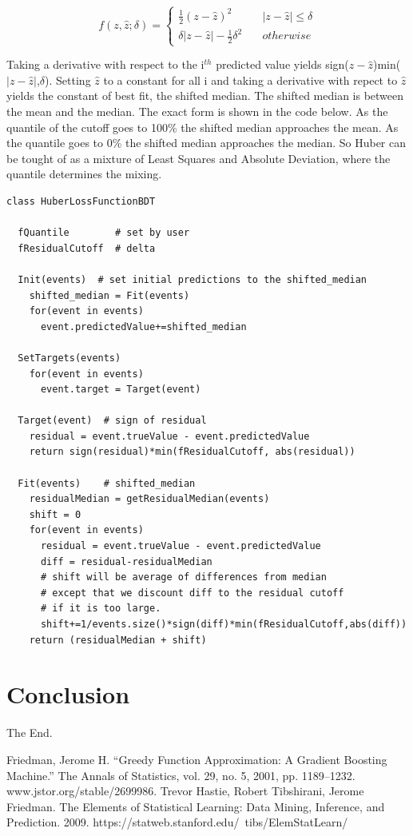 \documentclass[12pt]{article}
\begin{document}
$$
f(z,\hat{z}; \delta) = \left\{
        \begin{array}{ll}
            \frac{1}{2}(z-\hat{z})^2 & \quad |z-\hat{z}| \leq \delta \\
            \delta|z-\hat{z}| - \frac{1}{2}\delta^2 & \quad otherwise
        \end{array}
    \right.
$$

Taking a derivative with respect to the i$^{th}$ predicted value yields sign($z-\hat{z}$)min($|z-\hat{z}|$,$\delta$). Setting $\hat{z}$ to a constant for all i and taking a derivative with repect to $\hat{z}$ yields the constant of best fit, the shifted median. The shifted median is between the mean and the median. The exact form is shown in the code below. As the quantile of the cutoff goes to 100\% the shifted median approaches the mean. As the quantile goes to 0\% the shifted median approaches the median. So Huber can be tought of as a mixture of Least Squares and Absolute Deviation, where the quantile determines the mixing. 

\begin{verbatim}
class HuberLossFunctionBDT

  fQuantile        # set by user
  fResidualCutoff  # delta

  Init(events)  # set initial predictions to the shifted_median
    shifted_median = Fit(events)
    for(event in events)
      event.predictedValue+=shifted_median

  SetTargets(events)  
    for(event in events)  
      event.target = Target(event)

  Target(event)  # sign of residual                 
    residual = event.trueValue - event.predictedValue
    return sign(residual)*min(fResidualCutoff, abs(residual))

  Fit(events)    # shifted_median                
    residualMedian = getResidualMedian(events)
    shift = 0
    for(event in events)
      residual = event.trueValue - event.predictedValue
      diff = residual-residualMedian
      # shift will be average of differences from median
      # except that we discount diff to the residual cutoff
      # if it is too large.
      shift+=1/events.size()*sign(diff)*min(fResidualCutoff,abs(diff))
    return (residualMedian + shift)

\end{verbatim}

\section{Conclusion}

The End.

\begin{thebibliography}{9}
Friedman, Jerome H. “Greedy Function Approximation: A Gradient Boosting Machine.” The Annals of Statistics, vol. 29, no. 5, 2001, pp. 1189–1232. www.jstor.org/stable/2699986.
Trevor Hastie, Robert Tibshirani, Jerome Friedman. The Elements of Statistical Learning: Data Mining, Inference, and Prediction. 2009. https://statweb.stanford.edu/~tibs/ElemStatLearn/ 
\end{thebibliography}
\end{document}

